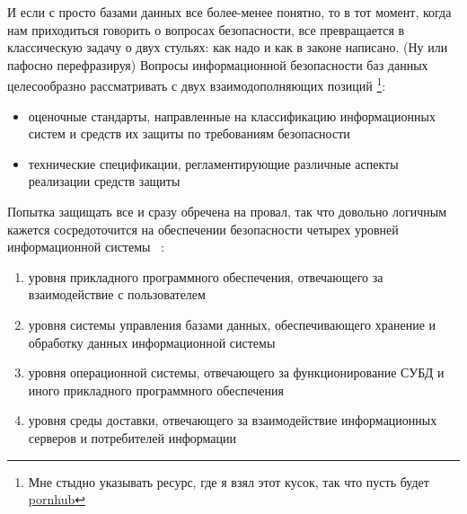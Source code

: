 И если с просто базами данных все более-менее понятно, то в тот момент, когда нам приходиться говорить о вопросах безопасности, все превращается в классическую задачу о двух стульях: как надо и как в законе написано. (Ну или пафосно перефразируя) Вопросы информационной безопасности баз данных целесообразно рассматривать с двух взаимодополняющих позиций \autocite{Lihonosov2011}\footnote{Мне стыдно указывать ресурс, где я взял этот кусок, так что пусть будет \href{http://www.e-biblio.ru/book/bib/01_informatika/b_baz_dan/sg.html\#_Toc327430692}{pornhub}}:
\begin{itemize}
	\item оценочные стандарты, направленные на классификацию информационных систем и средств их защиты по требованиям безопасности
	\item технические спецификации, регламентирующие различные аспекты реализации средств защиты
\end{itemize}

Попытка защищать все и сразу обречена на провал, так что довольно логичным кажется сосредоточится на обеспечении безопасности четырех уровней информационной системы \autocite{Lihonosov2011}~\label{pon:urov}:
\begin{enumerate}
	\item уровня прикладного программного обеспечения, отвечающего за взаимодействие с пользователем
	\item уровня системы управления базами данных, обеспечивающего хранение и обработку данных информационной системы
	\item уровня операционной системы, отвечающего за функционирование СУБД и иного прикладного программного обеспечения
	\item уровня среды доставки, отвечающего за взаимодействие информационных серверов и потребителей информации
\end{enumerate}

